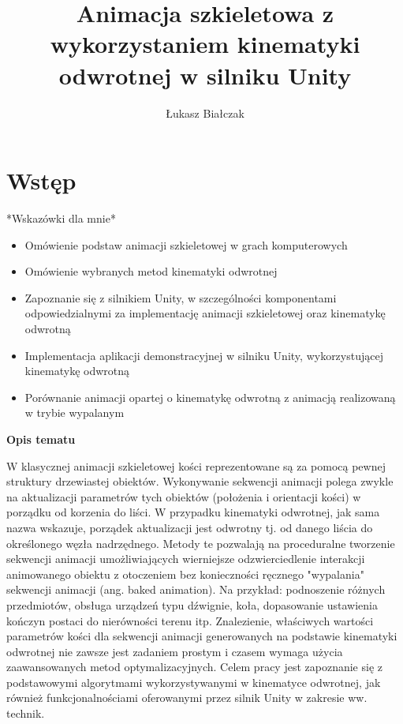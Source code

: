 \documentclass[a4paper, 12pt]{article} \linespread{1.3}
\title{Animacja szkieletowa z wykorzystaniem kinematyki odwrotnej w silniku
Unity}
\author{Łukasz Białczak} \date{}
\begin{document}
\maketitle

\tableofcontents

\section{Wstęp} *Wskazówki dla mnie* \begin{itemize}

    \item Omówienie podstaw animacji szkieletowej w grach komputerowych 
    \item Omówienie wybranych metod kinematyki odwrotnej 
    \item Zapoznanie się z silnikiem Unity, w szczególności komponentami
        odpowiedzialnymi za implementację animacji szkieletowej oraz kinematykę
        odwrotną 
    \item Implementacja aplikacji demonstracyjnej w silniku Unity,
        wykorzystującej kinematykę odwrotną 
    \item Porównanie animacji opartej o kinematykę odwrotną z animacją
        realizowaną w trybie wypalanym

\end{itemize}


\textbf{Opis tematu}

W klasycznej animacji szkieletowej kości reprezentowane są za pomocą pewnej
struktury drzewiastej obiektów. Wykonywanie sekwencji animacji polega zwykle na
aktualizacji parametrów tych obiektów (położenia i orientacji kości) w porządku
od korzenia do liści. W przypadku kinematyki odwrotnej, jak sama nazwa wskazuje,
porządek aktualizacji jest odwrotny tj. od danego liścia do określonego węzła
nadrzędnego. Metody te pozwalają na proceduralne tworzenie sekwencji animacji
umożliwiających wierniejsze odzwierciedlenie interakcji animowanego obiektu z
otoczeniem bez konieczności ręcznego "wypalania" sekwencji animacji (ang. baked
animation). Na przykład: podnoszenie różnych przedmiotów, obsługa urządzeń typu
dźwignie, koła, dopasowanie ustawienia kończyn postaci do nierówności terenu
itp. Znalezienie, właściwych wartości parametrów kości dla sekwencji animacji
generowanych na podstawie kinematyki odwrotnej nie zawsze jest zadaniem prostym i
czasem wymaga użycia zaawansowanych metod optymalizacyjnych. Celem pracy jest
zapoznanie się z podstawowymi algorytmami wykorzystywanymi w kinematyce
odwrotnej, jak również funkcjonalnościami oferowanymi przez silnik Unity w
zakresie ww. technik.
\end{document}
